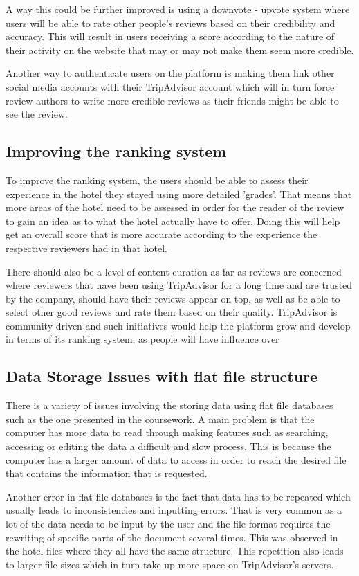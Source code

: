 \documentclass[titlepage]{article}
\begin{document}
            A way this could be further improved is using a downvote - upvote system where  users will be able to rate other people's reviews based on their credibility and accuracy. This will result in users receiving a score according to the nature of their activity on the website that may or may not make them seem more credible.
            
            Another way to authenticate users on the platform is making them link other social media accounts with their TripAdvisor account which will in turn force review authors to write more credible reviews as their friends might be able to see the review.
            
            \subsection{Improving the ranking system}
            
            To improve the ranking system, the users should be able to assess their experience in the hotel they stayed using more detailed 'grades'. That means that more areas of the hotel need to be assessed in order for the reader of the review to gain an idea as to what the hotel actually have to offer. Doing this will help get an overall score that is more accurate according to the experience the respective reviewers had in that hotel.
            
            There should also be a level of content curation as far as reviews are concerned where reviewers that have been using TripAdvisor for a long time and are trusted by the company, should have their reviews appear on top, as well as be able to select other good reviews and rate them based on their quality. TripAdvisor is community driven and such initiatives would help the platform grow and develop in terms of its ranking system, as people will have influence over 
            
            
            \subsection{Data Storage Issues with flat file structure}
           There is a variety of issues involving the storing data using flat file databases such as the one presented in the coursework. A main problem is that the computer has more data to read through  making features such as searching, accessing or editing the data a difficult and slow process. This is because the computer has a larger amount of data to access in order to reach the desired file that contains the information that is requested.
           
           Another error in flat file databases is the fact that data has to be repeated which usually leads to inconsistencies and inputting errors. That is very common as a lot of the data needs to be input by the user and the file format requires the rewriting of specific parts of the document several times. This was observed in the hotel files where they all have the same structure. This repetition also leads to larger file sizes which in turn take up more space on TripAdvisor's servers.
           
\end{document}
